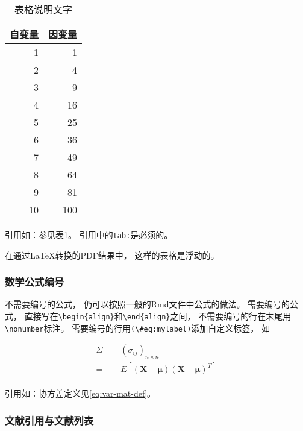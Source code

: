 \documentclass[
]{article}
\begin{document}
\begin{table}

\caption{\label{tab:u-w-tab-ex01}表格说明文字}
\centering
\begin{tabular}[t]{r|r}
\hline
自变量 & 因变量\\
\hline
1 & 1\\
\hline
2 & 4\\
\hline
3 & 9\\
\hline
4 & 16\\
\hline
5 & 25\\
\hline
6 & 36\\
\hline
7 & 49\\
\hline
8 & 64\\
\hline
9 & 81\\
\hline
10 & 100\\
\hline
\end{tabular}
\end{table}

引用如：参见表\ref{tab:u-w-tab-ex01}。
引用中的\texttt{tab:}是必须的。

在通过LaTeX转换的PDF结果中，
这样的表格是浮动的。

\hypertarget{usage-writing-math}{%
\subsubsection{数学公式编号}\label{usage-writing-math}}

不需要编号的公式，
仍可以按照一般的Rmd文件中公式的做法。
需要编号的公式，
直接写在\texttt{\textbackslash{}begin\{align\}}和\texttt{\textbackslash{}end\{align\}}之间，
不需要编号的行在末尾用\texttt{\textbackslash{}nonumber}标注。
需要编号的行用\texttt{(\textbackslash{}\#eq:mylabel)}添加自定义标签，
如

\begin{align}
\Sigma =&  (\sigma_{ij})_{n\times n} \nonumber \\
=& E[(\boldsymbol{X} - \boldsymbol{\mu}) (\boldsymbol{X} - \boldsymbol{\mu})^T ] 
\label{eq:var-mat-def}
\end{align}

引用如：协方差定义见\eqref{eq:var-mat-def}。

\hypertarget{ux6587ux732eux5f15ux7528ux4e0eux6587ux732eux5217ux8868}{%
\subsubsection{文献引用与文献列表}\label{ux6587ux732eux5f15ux7528ux4e0eux6587ux732eux5217ux8868}}
\end{document}

